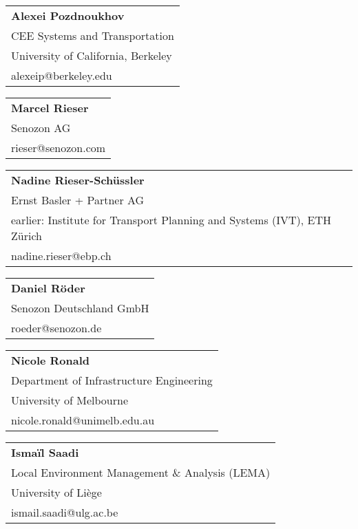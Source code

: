 \begin{tabular}[width=0.48\textwidth]{@{}l}
\textbf{Alexei Pozdnoukhov} \\
CEE Systems and Transportation \\
University of California, Berkeley \\
alexeip@berkeley.edu \\
\end{tabular}

\begin{tabular}[width=0.48\textwidth]{@{}l}
\textbf{Marcel Rieser} \\
Senozon AG \\
rieser@senozon.com \\
\end{tabular}

\begin{tabular}[width=0.48\textwidth]{@{}l}
\textbf{Nadine Rieser-Schüssler} \\
Ernst Basler + Partner AG \\
earlier: Institute for Transport Planning and Systems (IVT), ETH Zürich \\
nadine.rieser@ebp.ch \\
\end{tabular}

\begin{tabular}[width=0.48\textwidth]{@{}l}
\textbf{Daniel Röder} \\
Senozon Deutschland GmbH \\
roeder@senozon.de \\
\end{tabular}

\begin{tabular}[width=0.48\textwidth]{@{}l}
\textbf{Nicole Ronald} \\
Department of Infrastructure Engineering \\
University of Melbourne \\
nicole.ronald@unimelb.edu.au \\
\end{tabular}

\begin{tabular}[width=0.48\textwidth]{@{}l}
\textbf{Ismaïl Saadi} \\
Local Environment Management \& Analysis (LEMA) \\
University of Liège \\
ismail.saadi@ulg.ac.be \\
\end{tabular}

